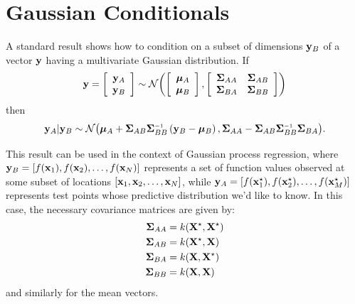 
\inbpdocument

\chapter{Gaussian Conditionals}
\label{ch:appendix-gaussians}


A standard result shows how to condition on a subset of dimensions ${\bf{y}}_B$ of a vector ${\bf{y}}$ having a multivariate Gaussian distribution.
If
%
\begin{align}
{\bf{y}} = \left[ \begin{array}{c} {{\bf{y}}_A} \\ {{\bf{y}}_B} \end{array} \right] \sim \mathcal{N}\!\left(\left[ \begin{array}{c} {{\boldsymbol{\mu}}_A} \\ {{\boldsymbol{\mu}}_B} \end{array} \right],\left[ \begin{array}{cc}\mathbf{\Sigma}_{AA} & \mathbf{\Sigma}_{AB} \\ \mathbf{\Sigma}_{BA} & \mathbf{\Sigma}_{BB} \end{array} \right]\right)
\end{align}
%
then
%
\begin{align}
\vy_A | \vy_B \sim \mathcal{N} \big(\vmu_A + \vSigma_{AB} \vSigma_{BB}\inv \left( \vy_B - \vmu_B \right),
\vSigma_{AA} - \vSigma_{AB} \vSigma_{BB}\inv \vSigma_{BA} \big).
\label{eq:gauss_conditional}
\end{align}

This result can be used in the context of Gaussian process regression, where ${\bf{y}}_B = [f({\bf{x}}_1), f({\bf{x}}_2), \dots, f({\bf{x}}_N)]$ represents a set of function values observed at some subset of locations $[{\bf{x}}_1, {\bf{x}}_2, \dots, {\bf{x}}_N]$, while ${\bf{y}}_A = [f({\bf{x}}_1^\star), f({\bf{x}}_2^\star), \ldots, f({\bf{x}}_M^\star)]$ represents test points whose predictive distribution we'd like to know.
In this case, the necessary covariance matrices are given by:
%
\begin{align}
\mathbf{\Sigma}_{AA} & = k(\mathbf{X}^\star, \mathbf{X}^\star) \\
\mathbf{\Sigma}_{AB} & = k(\mathbf{X}^\star, \mathbf{X}) \\
\mathbf{\Sigma}_{BA} & = k(\mathbf{X}, \mathbf{X}^\star) \\
\mathbf{\Sigma}_{BB} & = k(\mathbf{X}, \mathbf{X})
\end{align}
and similarly for the mean vectors.






